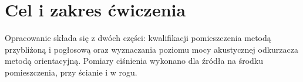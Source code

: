 \section*{Cel i zakres ćwiczenia}
Opracowanie składa się z dwóch części: kwalifikacji pomieszczenia metodą
przybliżoną i pogłosową oraz wyznaczania poziomu mocy akustycznej odkurzacza metodą
orientacyjną. Pomiary ciśnienia wykonano dla źródła na środku pomieszczenia,
przy ścianie i w rogu.
